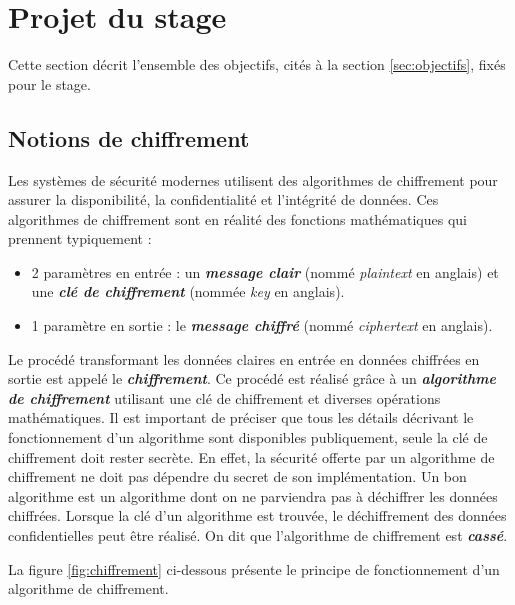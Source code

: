 \documentclass[10pt, oneside, a4paper]{article}
\begin{document}
\section{Projet du stage}
\label{sec:Projet}

Cette section décrit l'ensemble des objectifs, cités à la section \ref{sec:objectifs}, fixés pour le stage. 

\subsection{Notions  de chiffrement}

Les systèmes de sécurité modernes utilisent des algorithmes de chiffrement pour assurer la disponibilité, la confidentialité et l'intégrité de données. Ces algorithmes de chiffrement sont en réalité des fonctions mathématiques qui prennent typiquement : 
\begin{itemize}
\item  2 paramètres en entrée : un \textbf{\textit{message clair}} (nommé \textit{plaintext} en anglais) et une \textbf{\textit{clé de chiffrement}} (nommée \textit{key} en anglais).
\item 1 paramètre en sortie : le \textbf{\textit{message chiffré}} (nommé \textit{ciphertext} en anglais). \\
\end{itemize}
Le procédé transformant les données claires en entrée en données chiffrées en sortie est appelé le \textbf{\textit{chiffrement}}.
Ce procédé est réalisé grâce à un \textbf{\textit{algorithme de chiffrement}} utilisant une clé de chiffrement et diverses opérations mathématiques. Il est important de préciser que tous les détails décrivant le fonctionnement d'un algorithme sont disponibles publiquement, seule la clé de chiffrement doit rester secrète. En effet, la sécurité offerte par un algorithme de chiffrement ne doit pas dépendre du secret de son implémentation. Un bon algorithme est un algorithme dont on ne parviendra pas à déchiffrer les données chiffrées. Lorsque la clé d'un algorithme est trouvée, le déchiffrement des données confidentielles peut être réalisé. On dit que l'algorithme de chiffrement est \textbf{\textit{cassé}}.

La figure \ref{fig:chiffrement} ci-dessous présente le principe de fonctionnement d'un algorithme de chiffrement.
\end{document}
